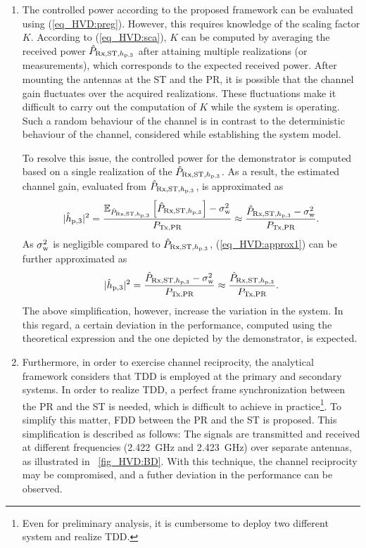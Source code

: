 \begin{enumerate}
	\item The controlled power according to the proposed framework can be evaluated using (\ref{eq_HVD:preg}). However, this requires knowledge of the scaling factor $K$. According to (\ref{eq_HVD:sca}), $K$ can be computed by averaging the received power $\hat{P}_{\text{Rx,ST,$h_{\text{p,3}}$}}$ after attaining multiple realizations (or measurements), which corresponds to the expected received power. After mounting the antennas at the ST and the PR, it is possible that the channel gain fluctuates over the acquired realizations. These fluctuations make it difficult to carry out the computation of $K$ while the system is operating. Such a random behaviour of the channel is in contrast to the deterministic behaviour of the channel, considered while establishing the system model. 

To resolve this issue, the controlled power for the demonstrator is computed based on a single realization of the $\hat{P}_{\text{Rx,ST,$h_{\text{p,3}}$}}$. As a result, the estimated channel gain, evaluated from $\hat{P}_{\text{Rx,ST,$h_{\text{p,3}}$}}$, is approximated as 
	\begin{equation}
		|\hat{h}_{\text{p,3}}|^2 = \frac{{\mathbb E}_{\hat{P}_{\text{Rx,ST,$h_{\text{p,3}}$}}}\left[ \hat{P}_{\text{Rx,ST,$h_{\text{p,3}}$}} \right]-\sigma^2_{\text{w}}}{P_{\text{Tx,PR}}} \approx \frac{\hat{P}_{\text{Rx,ST,$h_{\text{p,3}}$}}-\sigma^2_{\text{w}}}{P_{\text{Tx,PR}}}. 
		\label{eq_HVD:approx1}
	\end{equation}	
As $\sigma^2_{\text{w}}$ is negligible compared to $\hat{P}_{\text{Rx,ST,$h_{\text{p,3}}$}}$, (\ref{eq_HVD:approx1}) can be further approximated as 
	\begin{equation}
		|\hat{h}_{\text{p,3}}|^2 = \frac{\hat{P}_{\text{Rx,ST,$h_{\text{p,3}}$}}-\sigma^2_{\text{w}}}{P_{\text{Tx,PR}}} \approx \frac{\hat{P}_{\text{Rx,ST,$h_{\text{p,3}}$}}}{P_{\text{Tx,PR}}}.
		\label{eq_HVD:approx2}
	\end{equation}	
The above simplification, however, increase the variation in the system. In this regard, a certain deviation in the performance, computed using the theoretical expression and the one depicted by the demonstrator, is expected. 
	\item Furthermore, in order to exercise channel reciprocity, the analytical framework considers that TDD is employed at the primary and secondary systems. In order to realize TDD, a perfect frame synchronization between the PR and the ST is needed, which is difficult to achieve in practice\footnote{Even for preliminary analysis, it is cumbersome to deploy two different system and realize TDD.}. To simplify this matter, FDD between the PR and the ST is proposed. This simplification is described as follows: The signals are transmitted and received at different frequencies (\SI{2.422}{GHz} and \SI{2.423}{GHz}) over separate antennas, as illustrated in \figurename~\ref{fig_HVD:BD}. With this technique, the channel reciprocity may be compromised, and a futher deviation in the performance can be observed.	
\end{enumerate}

